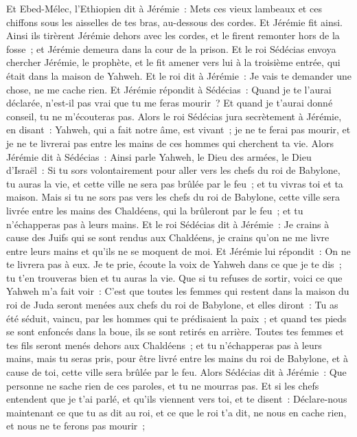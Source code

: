 \begin{multicols}{2}
Et Ebed-Mélec, l'Ethiopien dit à Jérémie~: Mets ces vieux lambeaux et ces chiffons sous les aisselles de tes bras, au-dessous des cordes. Et Jérémie fit ainsi.
Ainsi ils tirèrent Jérémie dehors avec les cordes, et le firent remonter hors de la fosse~; et Jérémie demeura dans la cour de la prison.
Et le roi Sédécias envoya chercher Jérémie, le prophète, et le fit amener vers lui à la troisième entrée, qui était dans la maison de Yahweh. Et le roi dit à Jérémie~: Je vais te demander une chose, ne me cache rien.
Et Jérémie répondit à Sédécias~: Quand je te l'aurai déclarée, n'est-il pas vrai que tu me feras mourir~? Et quand je t'aurai donné conseil, tu ne m'écouteras pas.
Alors le roi Sédécias jura secrètement à Jérémie, en disant~: Yahweh, qui a fait notre âme, est vivant~; je ne te ferai pas mourir, et je ne te livrerai pas entre les mains de ces hommes qui cherchent ta vie.
Alors Jérémie dit à Sédécias~: Ainsi parle Yahweh, le Dieu des armées, le Dieu d'Israël~: Si tu sors volontairement pour aller vers les chefs du roi de Babylone, tu auras la vie, et cette ville ne sera pas brûlée par le feu~; et tu vivras toi et ta maison.
Mais si tu ne sors pas vers les chefs du roi de Babylone, cette ville sera livrée entre les mains des Chaldéens, qui la brûleront par le feu~; et tu n'échapperas pas à leurs mains.
Et le roi Sédécias dit à Jérémie~: Je crains à cause des Juifs qui se sont rendus aux Chaldéens, je crains qu'on ne me livre entre leurs mains et qu'ils ne se moquent de moi.
Et Jérémie lui répondit~: On ne te livrera pas à eux. Je te prie, écoute la voix de Yahweh dans ce que je te dis~; tu t'en trouveras bien et tu auras la vie.
Que si tu refuses de sortir, voici ce que Yahweh m'a fait voir~:
C'est que toutes les femmes qui restent dans la maison du roi de Juda seront menées aux chefs du roi de Babylone, et elles diront~: Tu as été séduit, vaincu, par les hommes qui te prédisaient la paix~; et quand tes pieds se sont enfoncés dans la boue, ils se sont retirés en arrière.
Toutes tes femmes et tes fils seront menés dehors aux Chaldéens~; et tu n'échapperas pas à leurs mains, mais tu seras pris, pour être livré entre les mains du roi de Babylone, et à cause de toi, cette ville sera brûlée par le feu.
Alors Sédécias dit à Jérémie~: Que personne ne sache rien de ces paroles, et tu ne mourras pas.
Et si les chefs entendent que je t'ai parlé, et qu'ils viennent vers toi, et te disent~: Déclare-nous maintenant ce que tu as dit au roi, et ce que le roi t'a dit, ne nous en cache rien, et nous ne te ferons pas mourir~;

\end{multicols}

